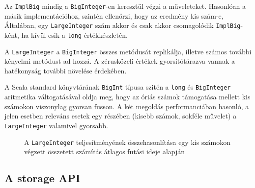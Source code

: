 \documentclass[
    parspace,
    noindent,
    nohyp,
]{elteiktdk}[2023/04/10]
\begin{document}
Az \texttt{ImplBig} mindig a \texttt{BigInteger}-en keresztül végzi a műveleteket.
Hasonlóan a másik implementációhoz, szintén ellenőrzi, hogy az eredmény kis szám-e,
Általában, egy \texttt{LargeInteger} szám akkor és csak akkor csomagolódik \texttt{ImplBig}-ként,
ha kívül esik a \texttt{long} értékkészletén.

A \texttt{LargeInteger} a \texttt{BigInteger} összes metódusát replikálja,
illetve számos további kényelmi metódust ad hozzá.
A zérusközeli értékek gyorsítótárazva vannak a hatékonyság további növelése érdekében.

A Scala standard könyvtárának \texttt{BigInt} típusa szitén a \texttt{long} és \texttt{BigInteger}
aritmetika váltogatásával oldja meg,
hogy az óriás számok támogatása mellett kis számokon viszonylag gyorsan fusson.
A két megoldás performanciában hasonló,
a jelen esetben releváns esetek egy részében (kisebb számok, sokféle művelet)
a \texttt{LargeInteger} valamivel gyorsabb.

\begin{figure}[H]
    \centering
    \caption{
        A \texttt{LargeInteger} teljesítményének összehasonlítása
        egy kis számokon végzett összetett számítás átlagos futási ideje alapján
    }
\end{figure}


\subsection{A storage API}
\end{document}
